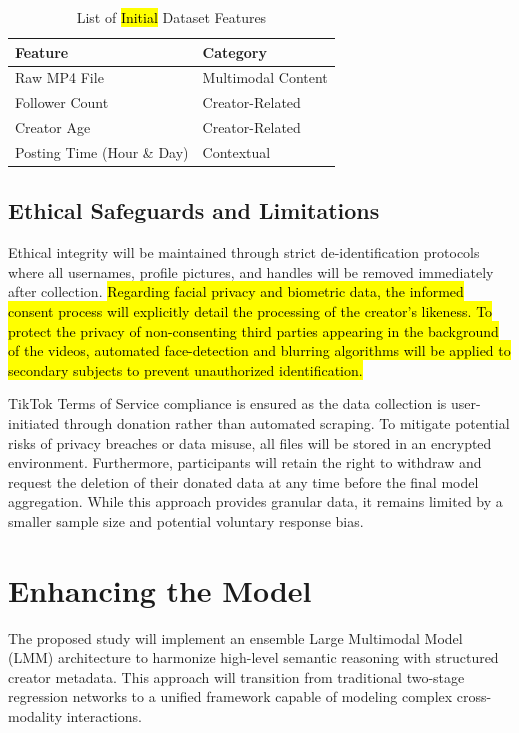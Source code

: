 \begin{table}[H]
    \centering
    \begin{tabular}{ll}
        \toprule
        \textbf{Feature}  & \textbf{Category} \\
        \midrule
        Raw MP4 File  & Multimodal Content \\
        Follower Count  & Creator-Related \\
        Creator Age  & Creator-Related \\
        Posting Time (Hour \& Day)  & Contextual \\
        \bottomrule
    \end{tabular}
    \caption{List of \hl{Initial} Dataset Features}
    \label{tab:feature_list}
\end{table}

\subsection{Ethical Safeguards and Limitations}

Ethical integrity will be maintained through strict de-identification protocols where all usernames, profile pictures, and handles will be removed immediately after collection. \hl{Regarding facial privacy and biometric data, the informed consent process will explicitly detail the processing of the creator’s likeness. To protect the privacy of non-consenting third parties appearing in the background of the videos, automated face-detection and blurring algorithms will be applied to secondary subjects to prevent unauthorized identification.}

TikTok Terms of Service compliance is ensured as the data collection is user-initiated through donation rather than automated scraping. To mitigate potential risks of privacy breaches or data misuse, all files will be stored in an encrypted environment. Furthermore, participants will retain the right to withdraw and request the deletion of their donated data at any time before the final model aggregation. While this approach provides granular data, it remains limited by a smaller sample size and potential voluntary response bias.

\section{Enhancing the Model}

The proposed study will implement an ensemble Large Multimodal Model (LMM) architecture to harmonize high-level semantic reasoning with structured creator metadata. This approach will transition from traditional two-stage regression networks to a unified framework capable of modeling complex cross-modality interactions.

